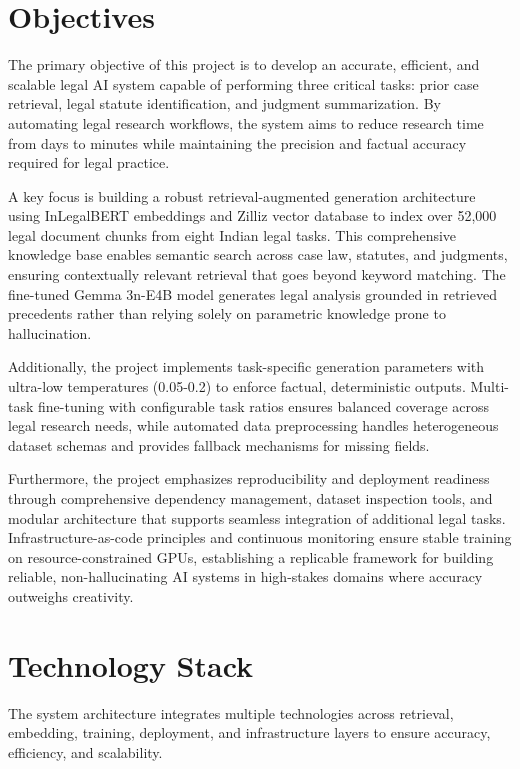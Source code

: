 \documentclass[11pt]{article}
\begin{document}
\section{Objectives}

The primary objective of this project is to develop an accurate, efficient, and scalable legal AI system capable of performing three critical tasks: prior case retrieval, legal statute identification, and judgment summarization. By automating legal research workflows, the system aims to reduce research time from days to minutes while maintaining the precision and factual accuracy required for legal practice.

A key focus is building a robust retrieval-augmented generation architecture using InLegalBERT embeddings and Zilliz vector database to index over 52,000 legal document chunks from eight Indian legal tasks. This comprehensive knowledge base enables semantic search across case law, statutes, and judgments, ensuring contextually relevant retrieval that goes beyond keyword matching. The fine-tuned Gemma 3n-E4B model generates legal analysis grounded in retrieved precedents rather than relying solely on parametric knowledge prone to hallucination.

Additionally, the project implements task-specific generation parameters with ultra-low temperatures (0.05-0.2) to enforce factual, deterministic outputs. Multi-task fine-tuning with configurable task ratios ensures balanced coverage across legal research needs, while automated data preprocessing handles heterogeneous dataset schemas and provides fallback mechanisms for missing fields.

Furthermore, the project emphasizes reproducibility and deployment readiness through comprehensive dependency management, dataset inspection tools, and modular architecture that supports seamless integration of additional legal tasks. Infrastructure-as-code principles and continuous monitoring ensure stable training on resource-constrained GPUs, establishing a replicable framework for building reliable, non-hallucinating AI systems in high-stakes domains where accuracy outweighs creativity.

\section{Technology Stack}

The system architecture integrates multiple technologies across retrieval, embedding, training, deployment, and infrastructure layers to ensure accuracy, efficiency, and scalability.
\end{document}
